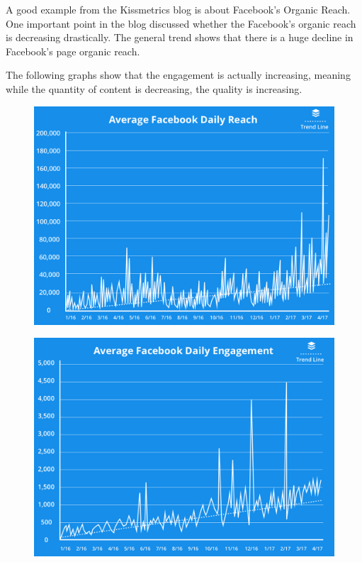 \documentclass[]{book}
\theoremstyle{definition}
\theoremstyle{definition}
\theoremstyle{definition}
\theoremstyle{remark}
\begin{document}
A good example from the Kissmetrics blog is about Facebook's Organic
Reach. One important point in the blog discussed whether the Facebook's
organic reach is decreasing drastically. The general trend shows that
there is a huge decline in Facebook's page organic reach.

The following graphs show that the engagement is actually increasing,
meaning while the quantity of content is decreasing, the quality is
increasing.

\begin{figure}
\centering
\includegraphics{images/average-facebook-reach.png}
\caption{}
\end{figure}

\begin{figure}
\centering
\includegraphics{images/average-facebook-daily-reach.png}
\caption{}
\end{figure}
\end{document}
